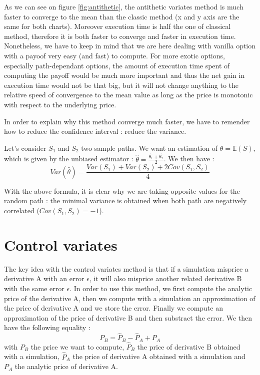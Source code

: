 \documentclass[hidelinks]{article}
\begin{document}
	As we can see on figure \ref{fig:antithetic}, the antithetic variates method is much faster to converge to the mean than the classic method (x and y axis are the same for both charts). Moreover execution time is half the one of classical method, therefore it is both faster to converge and faster in execution time. Nonetheless, we have to keep in mind that we are here dealing with vanilla option with a payoof very easy (and fast) to compute. For more exotic options, especially path-dependant options, the amount of execution time spent of computing the payoff  would be much more important and thus the net gain in execution time would not be that big, but it will not change anything to the relative speed of convergence to the mean value as long as the price is monotonic with respect to the underlying price. 
	
	In order to explain why this method converge much faster, we have to remender how to reduce the confidence interval : reduce the variance.
	
	Let's consider $S_1$ and $S_2$ two sample paths. We want an estimation of $\theta=\mathbb{E}(S)$, which is given by the unbiased estimator : $\hat{\theta}=\frac{\hat{\theta_1}+\hat{\theta_2}}{2}$. We then  have :
	$$Var(\hat{\theta})=\frac{Var(S_1)+Var(S_2)+2Cov(S_1,S_2)}{4}$$
	
	With the above formula, it is clear why we are taking opposite values for the random path : the minimal variance is obtained when both path are negatively correlated ($Cov(S_1,S_2)=-1$).
	
\newpage
\section{Control variates}
The key idea with the control variates method is that if a simulation misprice a derivative A with an error $\epsilon$, it will also misprice another related derivative B with the same error $\epsilon$. In order to use this method, we first compute the analytic price of the derivative A, then we compute with a simulation an approximation of the price of derivative A and we store the error. Finally we compute an approximation of the price of derivative B and then substract the error. We then have the following equality :
$$P_B=\hat{P}_B - \hat{P}_A + P_A$$
with $P_B$ the price we want to compute, $\hat{P}_B$ the price of derivative B obtained with a simulation, $\hat{P}_A$ the price of derivative A obtained with a simulation and $P_A$ the analytic price of derivative A.
\end{document}
